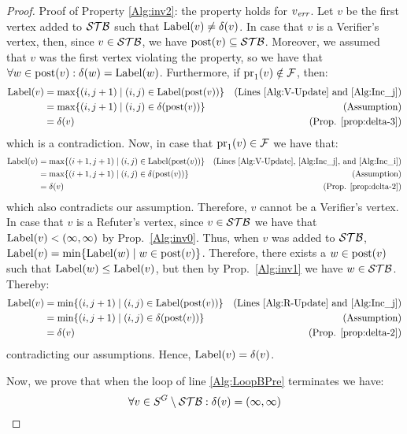 \begin{proof}
	Proof of Property \ref{Alg:inv2}: the property holds for $v_{\mathit{err}}$. Let $v$ be the first vertex added to $\mathcal{STB}$ such 
	that $\operatorname{Label}(v) \neq \delta(v)$. In case that $v$ is a Verifier's vertex, then, 
	since $v \in \mathcal{STB}$, we have $\operatorname{post}(v) \subseteq \mathcal{STB}$. Moreover,  we assumed that $v$ was the first vertex violating the property,  
	so we have that $\forall w \in \operatorname{post}(v):\delta(w)=\operatorname{Label}(w)$. Furthermore, if $\operatorname{pr}_{1}(v) \notin \mathcal{F}$, then: 
\begin{align*}
\operatorname{Label}(v) & = \max \{(i,j+1) \mid (i,j) \in \operatorname{Label}(\operatorname{post}(v))\}&  \text{(Lines \ref{Alg:V-Update} and \ref{Alg:Inc_j})}\\
	      & =  \max \{(i,j+1) \mid (i,j) \in \delta(\operatorname{post}(v))\}&  \text{(Assumption)}\\
	      & = \delta(v)& \text{(Prop. \ref{prop:delta-3})}
\end{align*}
which is a contradiction. Now, in case that $\operatorname{pr}_{1}(v) \in \mathcal{F}$ we have that:
\begin{align*}
\operatorname{Label}(v) & = \max \{(i+1,j+1) \mid (i,j) \in \operatorname{Label}(\operatorname{post}(v))\}&  \text{(Lines \ref{Alg:V-Update}, \ref{Alg:Inc_j}, and \ref{Alg:Inc_i})}\\
	      & =  \max \{(i+1,j+1) \mid (i,j) \in \delta(\operatorname{post}(v))\}&  \text{(Assumption)}\\
	      & = \delta(v)& \text{(Prop. \ref{prop:delta-2})}
\end{align*}
which also contradicts our assumption. Therefore, $v$ cannot be a Verifier's vertex. 
In case that $v$ is a Refuter's vertex, since $v \in \mathcal{STB}$ we have that $\operatorname{Label}(v) < (\infty, \infty)$ by Prop.~\ref{Alg:inv0}. 
Thus, when $v$ was added to $\mathcal{STB}$, $\operatorname{Label}(v) = \min\{ \operatorname{Label}(w) \mid w \in \operatorname{post}(v)\}$. Therefore, 
there exists a $w \in \operatorname{post}(v)$ such that $\operatorname{Label}(w) \leq \operatorname{Label}(v)$, but then by Prop.~\ref{Alg:inv1} 
we have $w \in \mathcal{STB}$. Thereby:
\begin{align*}
\operatorname{Label}(v) & = \min \{(i,j+1) \mid (i,j) \in \operatorname{Label}(\operatorname{post}(v))\}&  \text{(Lines \ref{Alg:R-Update} and \ref{Alg:Inc_j})} \\
	      & =  \min \{(i,j+1) \mid (i,j) \in \delta(\operatorname{post}(v))\}&  \text{(Assumption)}\\
	      & = \delta(v)& \text{(Prop. \ref{prop:delta-2})}
\end{align*}
contradicting our assumptions. Hence, $\operatorname{Label}(v) = \delta(v)$.

	Now, we prove that when the loop of line \ref{Alg:LoopBPre} terminates we have:
\begin{equation}\label{Alg:inv3}
 \forall v \in S^G \setminus \mathcal{STB} : \delta(v)=(\infty, \infty)
\end{equation}


\end{proof}
